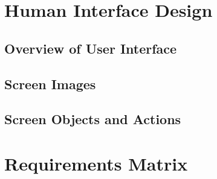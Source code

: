 \documentclass[a4paper,12pt,titlepage]{article}
\begin{document}
\newpage\section{Human Interface Design}
	\subsection{Overview of User Interface}
	\subsection{Screen Images}
	\subsection{Screen Objects and Actions}

	
\newpage\section{Requirements Matrix}
\end{document}
